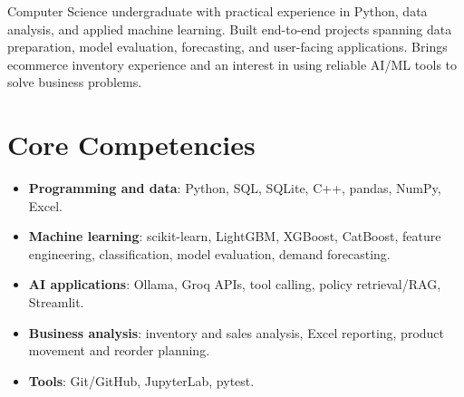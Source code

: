 \documentclass[11pt,a4paper,sans]{moderncv}
\begin{document}
\makecvtitle


\vspace{6pt}
\small{Computer Science undergraduate with practical experience in Python, data analysis, and applied machine learning. Built end-to-end projects spanning data preparation, model evaluation, forecasting, and user-facing applications. Brings ecommerce inventory experience and an interest in using reliable AI/ML tools to solve business problems.}


\section{Core Competencies}
\vspace{1pt}
\begin{itemize}

\item \textbf{Programming and data}: Python, SQL, SQLite, C++, pandas, NumPy, Excel.

\item \textbf{Machine learning}: scikit-learn, LightGBM, XGBoost, CatBoost, feature engineering, classification, model evaluation, demand forecasting.

\item \textbf{AI applications}: Ollama, Groq APIs, tool calling, policy retrieval/RAG, Streamlit.

\item \textbf{Business analysis}: inventory and sales analysis, Excel reporting, product movement and reorder planning.

\item \textbf{Tools}: Git/GitHub, JupyterLab, pytest.

\end{itemize}

\end{document}
